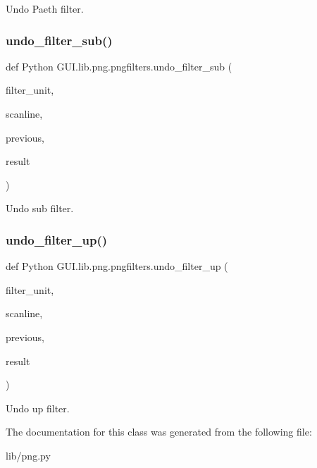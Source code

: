 \begin{DoxyVerb}Undo Paeth filter.\end{DoxyVerb}
 \mbox{\label{class_python_01_g_u_i_1_1lib_1_1png_1_1pngfilters_a0d8fe71494f4f43b5f2bcf02317fa5b7}} 
\subsubsection{\texorpdfstring{undo\+\_\+filter\+\_\+sub()}{undo\_filter\_sub()}}
{\footnotesize\ttfamily def Python G\+U\+I.\+lib.\+png.\+pngfilters.\+undo\+\_\+filter\+\_\+sub (\begin{DoxyParamCaption}\item[{}]{filter\+\_\+unit,  }\item[{}]{scanline,  }\item[{}]{previous,  }\item[{}]{result }\end{DoxyParamCaption})}

\begin{DoxyVerb}Undo sub filter.\end{DoxyVerb}
 \mbox{\label{class_python_01_g_u_i_1_1lib_1_1png_1_1pngfilters_a4580afb72d3f0e3346f7d64606d62981}} 
\subsubsection{\texorpdfstring{undo\+\_\+filter\+\_\+up()}{undo\_filter\_up()}}
{\footnotesize\ttfamily def Python G\+U\+I.\+lib.\+png.\+pngfilters.\+undo\+\_\+filter\+\_\+up (\begin{DoxyParamCaption}\item[{}]{filter\+\_\+unit,  }\item[{}]{scanline,  }\item[{}]{previous,  }\item[{}]{result }\end{DoxyParamCaption})}

\begin{DoxyVerb}Undo up filter.\end{DoxyVerb}
 

The documentation for this class was generated from the following file\+:\begin{DoxyCompactItemize}
\item 
lib/png.\+py\end{DoxyCompactItemize}
